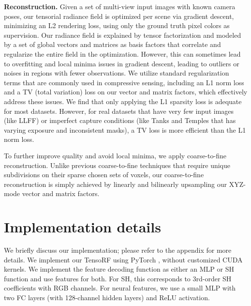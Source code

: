 \documentclass[runningheads]{llncs}
\newcommand{\boldstartspace}[1]{\vspace{0.1in}\noindent\textbf{#1}}
\begin{document}
\boldstartspace{Reconstruction.}
Given a set of multi-view input images with known camera poses, our tensorial radiance field is optimized per scene via gradient descent, minimizing an L2 rendering loss, using only the ground truth pixel colors as supervision.
Our radiance field is explained by tensor factorization and modeled by a set of global vectors and matrices as basis factors that correlate and regularize the entire field in the optimization.
However, this can sometimes lead to overfitting and local minima issues in gradient descent,
leading to outliers or noises in regions with fewer observations.
We utilize standard regularization terms that are commonly used in compressive sensing, including an L1 norm loss and a TV (total variation) loss on our vector and matrix factors, which effectively address these issues.
We find that only applying the L1 sparsity loss is adequate for most datasets. However, for real datasets that have very few input images (like LLFF\cite{llff}) or imperfect capture conditions (like Tanks and Temples \cite{Knapitsch2017,liu2020neural} that has varying exposure and inconsistent masks), a TV loss is more efficient than the L1 norm loss.




To further improve quality and avoid local minima, we apply coarse-to-fine reconstruction. Unlike previous coarse-to-fine techniques that require unique subdivisions on their sparse chosen sets of voxels, our coarse-to-fine reconstruction is simply achieved by linearly and bilinearly upsampling our XYZ-mode vector and matrix factors.
 
\section{Implementation details}





\label{sec:impl}
We briefly discuss our implementation; please refer to the appendix for more details.
We implement our TensoRF using PyTorch \cite{pytorch}, without customized CUDA kernels.
We implement the feature decoding function  as either an MLP or SH function and use  features for both. For SH, this corresponds to 3rd-order SH coefficients with RGB channels. For neural features, we use a small MLP with two FC layers (with 128-channel hidden layers) and ReLU activation.
\end{document}
